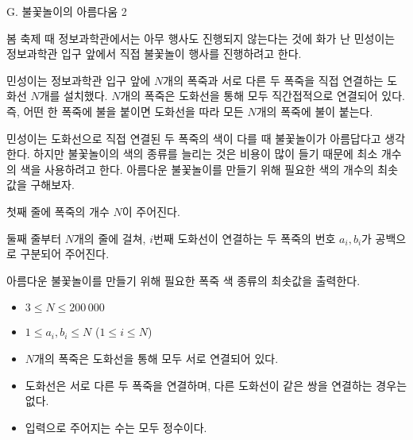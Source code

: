 \def\probtitle{불꽃놀이의 아름다움 2}
\def\probno{G} %

\begin{problem}{\probno{}. \probtitle{}}

봄 축제 때 정보과학관에서는 아무 행사도 진행되지 않는다는 것에 화가 난 민성이는 정보과학관 입구 앞에서 직접 불꽃놀이 행사를 진행하려고 한다.

민성이는 정보과학관 입구 앞에 $N$개의 폭죽과 서로 다른 두 폭죽을 직접 연결하는 도화선 $N$개를 설치했다. $N$개의 폭죽은 도화선을 통해 모두 직간접적으로 연결되어 있다. 즉, 어떤 한 폭죽에 불을 붙이면 도화선을 따라 모든 $N$개의 폭죽에 불이 붙는다.

민성이는 도화선으로 직접 연결된 두 폭죽의 색이 다를 때 불꽃놀이가 아름답다고 생각한다. 하지만 불꽃놀이의 색의 종류를 늘리는 것은 비용이 많이 들기 때문에 최소 개수의 색을 사용하려고 한다. 아름다운 불꽃놀이를 만들기 위해 필요한 색의 개수의 최솟값을 구해보자.


\InputFile

첫째 줄에 폭죽의 개수 $N$이 주어진다.

둘째 줄부터 $N$개의 줄에 걸쳐, $i$번째 도화선이 연결하는 두 폭죽의 번호 $a_i,b_i$가 공백으로 구분되어 주어진다.

\OutputFile

아름다운 불꽃놀이를 만들기 위해 필요한 폭죽 색 종류의 최솟값을 출력한다.

\Constraints

\begin{itemize}[topsep=0pt,noitemsep]
    \item $3\leq N\leq 200\,000$ 
    \item $1\leq a_i,b_i\leq N$ ($1 \le i \le N$)
    \item $N$개의 폭죽은 도화선을 통해 모두 서로 연결되어 있다.
    \item 도화선은 서로 다른 두 폭죽을 연결하며, 다른 도화선이 같은 쌍을 연결하는 경우는 없다. 
    \item 입력으로 주어지는 수는 모두 정수이다.
\end{itemize}

\Example

\begin{example}
\end{example}

\Notes
\usetikzlibrary{patterns}
\begin{tikzpicture}[scale=2, every node/.style={circle, draw, thick, minimum size=1cm}]


\end{tikzpicture}
\end{problem}
